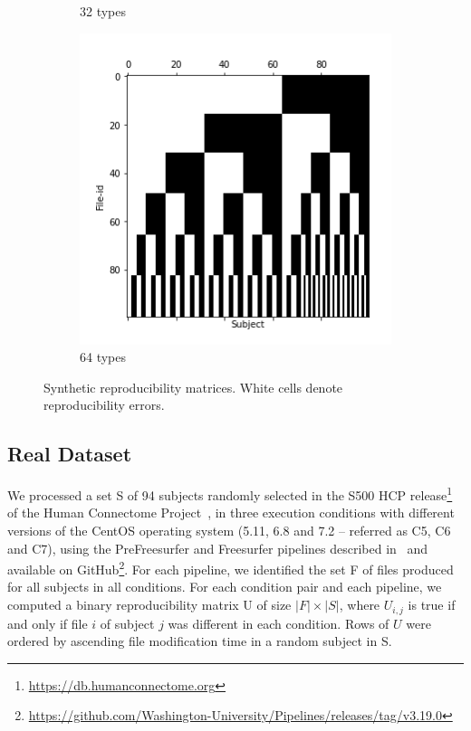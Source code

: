 \documentclass[10pt, conference, compsocconf]{IEEEtran}
\begin{document}
\begin{figure}
\begin{subfigure}[b]{0.45\columnwidth}
                  \caption{32 types}
        \end{subfigure}
                \begin{subfigure}[b]{0.45\columnwidth}
                  \includegraphics[width=\columnwidth]{data/Utility_Matrix/Synthetic/synthetic_subject_types/64_SubjectType_utility_matrix.png}
                  \caption{64 types}
        \end{subfigure}
\caption{Synthetic reproducibility matrices. White cells denote reproducibility errors.}
\label{fig:synthetic-data}
\end{figure}

\subsection{Real Dataset}

We
processed a set S of 94 subjects randomly selected in the S500 HCP 
release\footnote{\url{https://db.humanconnectome.org}} of the Human 
Connectome Project~\cite{glasser2013minimal}, in three execution 
conditions with different versions of the CentOS operating system 
(5.11, 6.8 and 7.2 -- referred as C5, C6 and C7), using the 
PreFreesurfer and Freesurfer pipelines described 
in~\cite{glasser2013minimal} and available on 
GitHub\footnote{\url{https://github.com/Washington-University/Pipelines/releases/tag/v3.19.0}}. 
For each pipeline, we identified the set F of files produced for all 
subjects in all conditions. For each condition pair and each pipeline, 
we computed a binary reproducibility matrix U of size $|F|\times|S|$, 
where $U_{i,j}$ is true if and only if file $i$ of subject $j$ was 
different in each condition. Rows of $U$ were ordered by ascending file 
modification time in a random subject in S.
\end{document}
